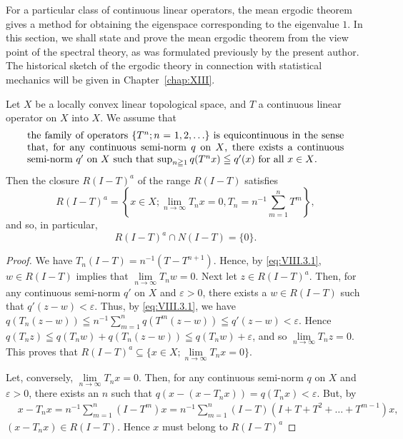 \label{sec:VIII.3}

For a particular class of continuous linear operators, the mean ergodic theorem gives a method for obtaining the eigenspace corresponding to the eigenvalue $1$. In this section, we shall state and prove the mean ergodic theorem from the view point of the spectral theory, as was formulated previously by the present author. The historical sketch of the ergodic theory in connection with statistical mechanics will be given in Chapter~\ref{chap:XIII}. 

\begin{theorem}\label{thm:VIII.3.Theorem.1} Let $X$ be a locally convex linear topological space, and $T$ a continuous linear operator on $X$ into $X$. We assume that 
\begin{equation}\label{eq:VIII.3.1}
\parbox{0.92\linewidth}{\everymath{}\let\limits\nolimits the family of operators $\{T^{n}; n=1,2,\ldots\}$ is equicontinuous in the sense that, for any continuous semi-norm $q$ on $X$, there exists a continuous semi-norm $q'$ on $X$ such that $\sup\limits_{n\geqq1}q(T^{n}x)\leqq q'(x)$ for all $x\in X$.}
\end{equation}
Then the closure $R(I - T)^a$ of the range $R(I - T)$ satisfies 
\begin{equation}\label{eq:VIII.3.2}
R (I - T) ^{a} = \left\{x \in X; \lim\limits _{n \rightarrow \infty} T _{n} x = 0, T _{n} = n ^{-1} \sum\limits_{m=1} ^{n} T ^{m} \right\},
\end{equation}
and so, in particular, 
\begin{equation}\label{eq:VIII.3.3}
R (I - T) ^{a} \cap N (I - T) = \{0 \}.
\end{equation}
\end{theorem}

\begin{proof}
 We have $T_{n}(I - T) = n^{-1}(T - T^{n+1})$. Hence, by \eqref{eq:VIII.3.1}, $w \in R(I - T)$ implies that $\lim\limits_{n\to \infty}T_nw = 0$. Next let $z \in R(I - T)^a$. Then, for any continuous semi-norm $q'$ on $X$ and $\varepsilon > 0$, there exists a $w \in R(I - T)$ such that $q'(z - w) < \varepsilon$. Thus, by \eqref{eq:VIII.3.1}, we have $q(T_{n}(z - w)) \leqq n^{-1}\sum\limits_{m=1}^{n}q(T^{m}(z - w)) \leqq q'(z - w) < \varepsilon$. Hence $q(T_{n}z) \leqq q(T_{n}w) + q(T_{n}(z - w)) \leqq q(T_{n}w) + \varepsilon$, and so $\lim\limits_{n\to \infty}T_nz = 0$. This proves that $R(I - T)^a \subseteq \{x \in X; \lim\limits_{n\to \infty}T_nx = 0\}$. 

Let, conversely, $\lim\limits_{n\to \infty}T_nx = 0$. Then, for any continuous semi-norm $q$ on $X$ and $\varepsilon >0$, there exists an $n$ such that $q(x - (x - T_nx)) = q(T_nx) < \varepsilon$. But, by 
\[
\begin{aligned}
&x - T _{n} x  = n ^{-1} \sum\limits_{m=1} ^{n} (I - T ^{m}) x = n ^{-1} \sum\limits_{m=1} ^{n} (I - T) (I + T + T ^{2} + \dots + T ^{m-1}) x,
\end{aligned}
\]
$(x - T_{n}x)\in R(I - T)$. Hence $x$ must belong to $R(I - T)^{a}$ 
\end{proof}

